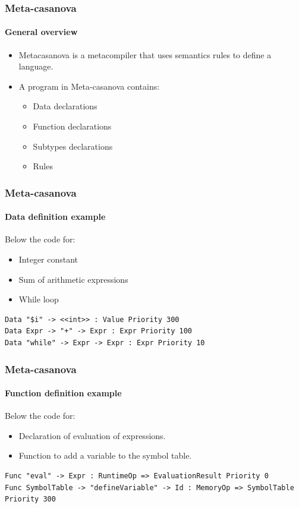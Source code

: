 \documentclass[mathserif,serif]{beamer}
\begin{document}
\begin{frame}
	\frametitle{Meta-casanova}
	\framesubtitle{General overview}
	
	\begin{itemize}
		\item Metacasanova is a metacompiler that uses semantics rules to define a language.
		\item A program in Meta-casanova contains:
		\begin{itemize}
			\item Data declarations
			\item Function declarations
			\item Subtypes declarations
			\item Rules
		\end{itemize}
	\end{itemize}

\end{frame}

\begin{frame}[fragile]
	\frametitle{Meta-casanova}
	\framesubtitle{Data definition example}
	
	Below the code for:
	\begin{itemize}
		\item Integer constant
		\item Sum of arithmetic expressions
		\item While loop
	\end{itemize}
	
	\begin{lstlisting}
Data "$i" -> <<int>> : Value Priority 300
Data Expr -> "+" -> Expr : Expr Priority 100
Data "while" -> Expr -> Expr : Expr Priority 10
	\end{lstlisting}
\end{frame}

\begin{frame}[fragile]
	\frametitle{Meta-casanova}
	\framesubtitle{Function definition example}
	Below the code for:
	\begin{itemize}
		\item Declaration of evaluation of expressions.
		\item Function to add a variable to the symbol table.
	\end{itemize}
	
	\begin{lstlisting}
Func "eval" -> Expr : RuntimeOp => EvaluationResult Priority 0
Func SymbolTable -> "defineVariable" -> Id : MemoryOp => SymbolTable Priority 300
	\end{lstlisting}
\end{frame}
\end{document}
